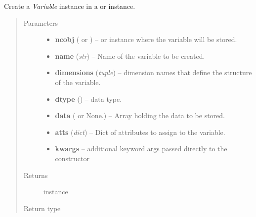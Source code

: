 \documentclass[letterpaper,10pt,english]{sphinxmanual}
\begin{document}
\begin{fulllineitems}
\label{docs/utilities:nctools.nc_create_var}
Create a \emph{Variable} instance in a  or
 instance.
\begin{quote}\begin{description}
\item[{Parameters}] \leavevmode\begin{itemize}
\item {} 
\textbf{ncobj} ( or ) --  or  instance
where the variable will be stored.

\item {} 
\textbf{name} (\emph{str}) -- Name of the variable to be created.

\item {} 
\textbf{dimensions} (\emph{tuple}) -- dimension names that define the structure of
the variable.

\item {} 
\textbf{dtype} () --  data type.

\item {} 
\textbf{data} ( or None.) --  Array holding the data to be stored.

\item {} 
\textbf{atts} (\emph{dict}) -- Dict of attributes to assign to the variable.

\item {} 
\textbf{kwargs} -- additional keyword args passed directly to the
 constructor

\end{itemize}

\item[{Returns}] \leavevmode
{} instance

\item[{Return type}] \leavevmode
{}

\end{description}\end{quote}

\end{fulllineitems}


\end{document}
